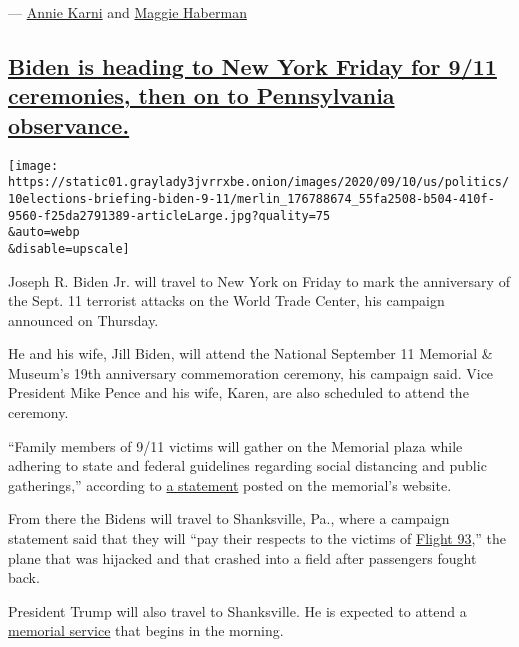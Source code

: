 --- \href{https://www.nytimes3xbfgragh.onion/by/annie-karni}{Annie
Karni} and
\href{https://www.nytimes3xbfgragh.onion/by/maggie-haberman}{Maggie
Haberman}

\hypertarget{biden-is-heading-to-new-york-friday-for-911-ceremonies-then-on-to-pennsylvania-observance}{%
\subsection{\texorpdfstring{\protect\hyperlink{biden-is-heading-to-new-york-friday-for-9-11-ceremonies-then-on-to-pennsylvania-observance}{Biden
is heading to New York Friday for 9/11 ceremonies, then on to
Pennsylvania
observance.}}{Biden is heading to New York Friday for 9/11 ceremonies, then on to Pennsylvania observance.}}\label{biden-is-heading-to-new-york-friday-for-911-ceremonies-then-on-to-pennsylvania-observance}}

\texttt{[image: https://static01.graylady3jvrrxbe.onion/images/2020/09/10/us/politics/10elections-briefing-biden-9-11/merlin\_176788674\_55fa2508-b504-410f-9560-f25da2791389-articleLarge.jpg?quality=75\\\&auto=webp\\\&disable=upscale]}

Joseph R. Biden Jr. will travel to New York on Friday to mark the
anniversary of the Sept. 11 terrorist attacks on the World Trade Center,
his campaign announced on Thursday.

He and his wife, Jill Biden, will attend the National September 11
Memorial \& Museum's 19th anniversary commemoration ceremony, his
campaign said. Vice President Mike Pence and his wife, Karen, are also
scheduled to attend the ceremony.

``Family members of 9/11 victims will gather on the Memorial plaza while
adhering to state and federal guidelines regarding social distancing and
public gatherings,'' according to
\href{https://911memorial.org/connect/commemoration/September-11-2001/19th-anniversary-commemoration}{a
statement} posted on the memorial's website.

From there the Bidens will travel to Shanksville, Pa., where a campaign
statement said that they will ``pay their respects to the victims of
\href{https://www.nytimes3xbfgragh.onion/2001/09/13/us/after-attacks-united-flight-93-doomed-flight-passengers-vowed-perish-fighting.html}{Flight
93},'' the plane that was hijacked and that crashed into a field after
passengers fought back.

President Trump will also travel to Shanksville. He is expected to
attend a
\href{https://www.nps.gov/flni/planyourvisit/sept11observance.htm}{memorial
service} that begins in the morning.

